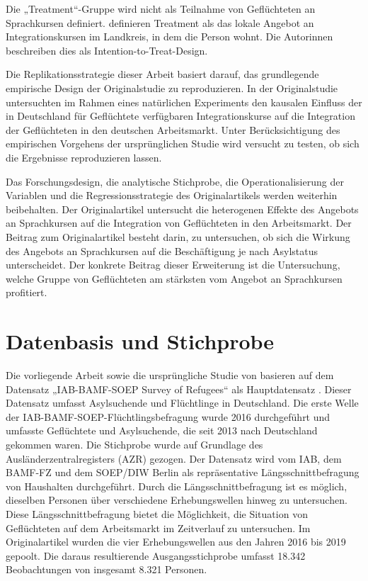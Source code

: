 Die „Treatment“-Gruppe wird nicht als Teilnahme von Geflüchteten an Sprachkursen definiert. \textcite{Kanas:2023} definieren Treatment als das lokale Angebot an Integrationskursen im Landkreis, in dem die Person wohnt. Die Autorinnen beschreiben dies als Intention-to-Treat-Design. 

Die Replikationsstrategie dieser Arbeit basiert darauf, das grundlegende empirische Design der Originalstudie zu reproduzieren. In der Originalstudie untersuchten \textcite{Kanas:2023} im Rahmen eines natürlichen Experiments den kausalen Einfluss der in Deutschland für Geflüchtete verfügbaren Integrationskurse auf die Integration der Geflüchteten in den deutschen Arbeitsmarkt. Unter Berücksichtigung des empirischen Vorgehens der ursprünglichen Studie wird versucht zu testen, ob sich die Ergebnisse reproduzieren lassen.

Das Forschungsdesign, die analytische Stichprobe, die Operationalisierung der Variablen und die Regressionsstrategie des Originalartikels werden weiterhin beibehalten. Der Originalartikel untersucht die heterogenen Effekte des Angebots an Sprachkursen auf die Integration von Geflüchteten in den Arbeitsmarkt. Der Beitrag zum Originalartikel besteht darin, zu untersuchen, ob sich die Wirkung des Angebots an Sprachkursen auf die Beschäftigung je nach Asylstatus unterscheidet. Der konkrete Beitrag dieser Erweiterung ist die Untersuchung, welche Gruppe von Geflüchteten am stärksten vom Angebot an Sprachkursen profitiert.

\section{Datenbasis und Stichprobe}
\label{cha:datenbasis}

Die vorliegende Arbeit sowie die ursprüngliche Studie von \textcite{Kanas:2023} basieren auf dem Datensatz „IAB-BAMF-SOEP Survey of Refugees“ als Hauptdatensatz \parencite{iab_bamf_soep_2021}. Dieser Datensatz umfasst Asylsuchende und Flüchtlinge in Deutschland. Die erste Welle der IAB-BAMF-SOEP-Flüchtlingsbefragung wurde 2016 durchgeführt und umfasste Geflüchtete und Asylsuchende, die seit 2013 nach Deutschland gekommen waren. Die Stichprobe wurde auf Grundlage des Ausländerzentralregisters (AZR) gezogen. Der Datensatz wird vom IAB, dem BAMF-FZ und dem SOEP/DIW Berlin als repräsentative Längsschnittbefragung von Haushalten durchgeführt. Durch die Längsschnittbefragung ist es möglich, dieselben Personen über verschiedene Erhebungswellen hinweg zu untersuchen. Diese Längsschnittbefragung bietet die Möglichkeit, die Situation von Geflüchteten auf dem Arbeitsmarkt im Zeitverlauf zu untersuchen. Im Originalartikel wurden die vier Erhebungswellen aus den Jahren 2016 bis 2019 gepoolt. Die daraus resultierende Ausgangsstichprobe umfasst 18.342 Beobachtungen von insgesamt 8.321 Personen.


